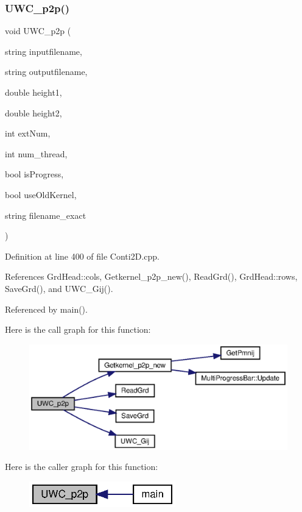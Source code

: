 \subsubsection{U\+W\+C\+\_\+p2p()}
{\footnotesize\ttfamily void U\+W\+C\+\_\+p2p (\begin{DoxyParamCaption}\item[{string}]{inputfilename,  }\item[{string}]{outputfilename,  }\item[{double}]{height1,  }\item[{double}]{height2,  }\item[{int}]{ext\+Num,  }\item[{int}]{num\+\_\+thread,  }\item[{bool}]{is\+Progress,  }\item[{bool}]{use\+Old\+Kernel,  }\item[{string}]{filename\+\_\+exact }\end{DoxyParamCaption})}



Definition at line 400 of file Conti2\+D.\+cpp.



References Grd\+Head\+::cols, Getkernel\+\_\+p2p\+\_\+new(), Read\+Grd(), Grd\+Head\+::rows, Save\+Grd(), and U\+W\+C\+\_\+\+Gij().



Referenced by main().

Here is the call graph for this function\+:
\nopagebreak
\begin{figure}[H]
\begin{center}
\leavevmode
\includegraphics[width=350pt]{Conti2D_8h_a7b6bfe9f5b32bc1a62005196d84edfde_a7b6bfe9f5b32bc1a62005196d84edfde_cgraph}
\end{center}
\end{figure}
Here is the caller graph for this function\+:\nopagebreak
\begin{figure}[H]
\begin{center}
\leavevmode
\includegraphics[width=180pt]{Conti2D_8h_a7b6bfe9f5b32bc1a62005196d84edfde_a7b6bfe9f5b32bc1a62005196d84edfde_icgraph}
\end{center}
\end{figure}
\mbox{\label{Conti2D_8h_af82757cb7e0f4f398e774b4e89b9ea72_af82757cb7e0f4f398e774b4e89b9ea72}} 
